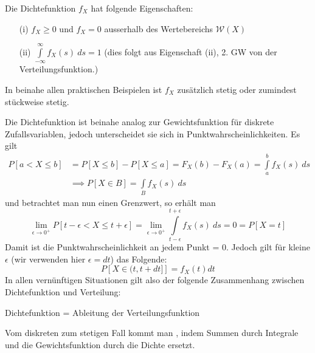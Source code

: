 \begin{satz}
Die Dichtefunktion $f_X$ hat folgende Eigenschaften:
\begin{itemize}
\item[(i)] $f_X \geq 0$ und $f_X = 0$ ausserhalb des Wertebereichs $\mathcal{W}(X)$
\item[(ii)] $ \int \limits_{-\infty}^{\infty} f_X(s) \: ds = 1$ (dies folgt aus Eigenschaft (ii), 2. GW von der Verteilungsfunktion.)
\end{itemize}
In beinahe allen praktischen Beispielen ist $f_X$ zusätzlich stetig oder zumindest stückweise stetig.
\end{satz}

Die Dichtefunktion ist beinahe analog zur Gewichtsfunktion für diskrete Zufallsvariablen, jedoch unterscheidet sie sich in Punktwahrscheinlichkeiten. Es gilt
\begin{align*}
P[a < X \leq b] &= P[X \leq b] - P[X \leq a] = F_X(b) - F_X(a) = \int \limits_a^b f_X(s) \: ds \\&\implies P[X\in B] = \int\limits_B f_X(s)\: ds
\end{align*}
und betrachtet man nun einen Grenzwert, so erhält man
$$ \lim_{\epsilon \to 0^+} P[t-\epsilon < X \leq t + \epsilon] = \lim_{\epsilon \to 0^+} \int \limits_{t-\epsilon}^{t+\epsilon} f_X(s) \: ds = 0 = P[X=t]$$
Damit ist die Punktwahrscheinlichkeit an jedem Punkt = 0. Jedoch gilt für kleine $\epsilon$ (wir verwenden hier $\epsilon= dt$) das Folgende:
$$ P\left[X\in (t,t+dt]\right] = f_X(t) dt$$
In allen vernünftigen Situationen gilt also der folgende Zusammenhang zwischen Dichtefunktion und Verteilung:
\begin{center}
Dichtefunktion = Ableitung der Verteilungsfunktion
\end{center}
Vom diskreten zum stetigen Fall kommt man , indem Summen durch Integrale und die Gewichtsfunktion durch die Dichte ersetzt.

